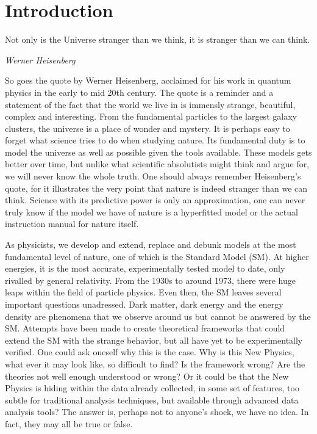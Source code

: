\chapter*{Introduction}

\epigraph{Not only is the Universe stranger than we think, it is stranger than we can think.}{\textit{Werner Heisenberg}}
So goes the quote by Werner Heisenberg, acclaimed for his work in quantum physics in the early to mid 
20th century. The quote is a reminder and a statement of the fact that the world we live in is immensly 
strange, beautiful, complex and interesting. From the fundamental particles to the largest galaxy clusters, 
the universe is a place of wonder and mystery. It is perhaps easy to forget what science tries to do
when studying nature. Its fundamental duty is to model the universe as well as possible given the tools 
available. These models gets better over time, but unlike what scientific absolutists might think and 
argue for, we will never know the whole truth. One should always remember Heisenberg's quote, for it
illustrates the very point that nature is indeed stranger than we can think. Science with its 
predictive power is only an approximation, one can never truly know if the model we have of nature is 
a hyperfitted model or the actual instruction manual for nature itself. \par 
As physicists, we develop 
and extend, replace and debunk models at the most fundamental level of nature, one of which is
the Standard Model (SM). At higher energies, it is the most accurate, experimentally tested model to date,
only rivalled by general relativity. From the 1930s to around 1973, there were huge leaps within the field
of particle physics. Even then, the SM leaves several important questions unadressed. Dark matter, dark energy
and the energy density are phenomena that we observe around us but cannot be answered by the SM. 
Attempts have been made to create theoretical frameworks that could extend the SM with the strange behavior, 
but all have yet to be experimentally verified. One could ask oneself why 
this is the case. Why is this New Physics, what ever it may look like, so difficult to find? 
Is the framework wrong? Are the theories not well enough understood or wrong? Or it could be that
the New Physics is hiding within the data already collected, in some set of features, too subtle for
traditional analysis techniques, but available through advanced data analysis tools? The answer is, perhaps not to 
anyone's shock, we have no idea. In fact, they may all be true or false.\par 
